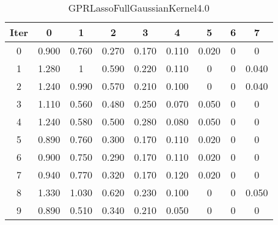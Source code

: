 \begin{table}
	\begin{center}
		\begin{tabular}{|c|c|c|c|c|c|c|c|c|}
			\hline
			Iter & 0 & 1 & 2 & 3 & 4 & 5 & 6 & 7 \\
			\hline
			0 & 0.900 & 0.760 & 0.270 & 0.170 & 0.110 & 0.020 & 0 & 0 \\
			\hline
			1 & 1.280 & 1 & 0.590 & 0.220 & 0.110 & 0 & 0 & 0.040 \\
			\hline
			2 & 1.240 & 0.990 & 0.570 & 0.210 & 0.100 & 0 & 0 & 0.040 \\
			\hline
			3 & 1.110 & 0.560 & 0.480 & 0.250 & 0.070 & 0.050 & 0 & 0 \\
			\hline
			4 & 1.240 & 0.580 & 0.500 & 0.280 & 0.080 & 0.050 & 0 & 0 \\
			\hline
			5 & 0.890 & 0.760 & 0.300 & 0.170 & 0.110 & 0.020 & 0 & 0 \\
			\hline
			6 & 0.900 & 0.750 & 0.290 & 0.170 & 0.110 & 0.020 & 0 & 0 \\
			\hline
			7 & 0.940 & 0.770 & 0.320 & 0.170 & 0.120 & 0.020 & 0 & 0 \\
			\hline
			8 & 1.330 & 1.030 & 0.620 & 0.230 & 0.100 & 0 & 0 & 0.050 \\
			\hline
			9 & 0.890 & 0.510 & 0.340 & 0.210 & 0.050 & 0 & 0 & 0 \\
			\hline
		\end{tabular}
	\end{center}
	\caption{GPRLassoFullGaussianKernel4.0}
\end{table}